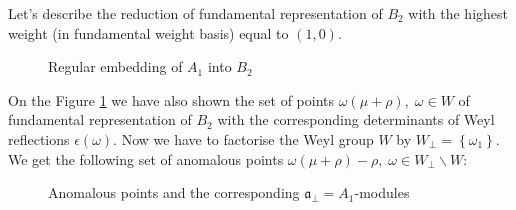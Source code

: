 \documentclass[a4paper,12pt]{article}
\theoremstyle{definition} \newtheorem{Def}{Definition}
\begin{document}
Let's describe the reduction of fundamental representation of $B_2$ with the highest weight (in fundamental weight basis) equal to $(1,0)$.
\begin{figure}[ph]
  \noindent{}
  \caption{Regular embedding of $A_1$ into $B_2$}
  \label{fig:B2_A1}
\end{figure}
On the Figure \ref{fig:B2_A1} we have also shown the set of points $\omega(\mu+\rho),\; \omega\in W$ of fundamental representation of $B_2$ with the corresponding determinants of Weyl reflections $\epsilon(\omega)$.
Now we have to factorise the Weyl group $W$ by $W_{\bot}=\left\{\omega_1\right\}$. We get the following set of anomalous points $\omega(\mu+\rho)-\rho,\; \omega\in W_{\bot}\backslash W$:
\begin{figure}[ph]
  \noindent{}
  \caption{Anomalous points and the corresponding $\mathfrak{a}_{\bot}=A_1$-modules}
  \label{fig:B2_A1_2}
\end{figure}
\end{document}
